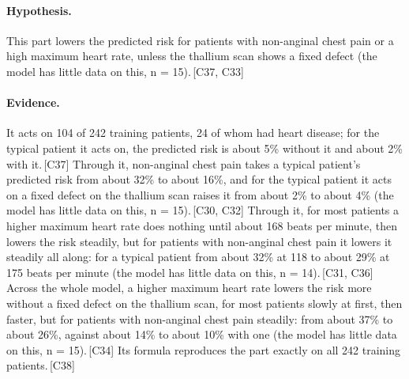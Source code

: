 \documentclass[a4paper,10pt]{article}
\newif\ifreviewmarks
\newcommand{\reviewrule}{\noindent{\color{BrickRed}\rule{\linewidth}{0.8pt}}}
\newenvironment{drafted}[1][]{%
  \ifreviewmarks\par\addvspace{\medskipamount}\reviewrule\par\nopagebreak
  \noindent{\color{BrickRed}\sffamily\footnotesize\textbf{Thesis Draft}\quad #1\hfill review}\par\nopagebreak\smallskip\fi}{%
  \ifreviewmarks\par\smallskip\noindent{\color{BrickRed}\sffamily\footnotesize end of thesis draft}\par\nopagebreak\reviewrule\par\medskip\fi}
\begin{document}
\begin{drafted}[plain-language layer: heart-s2-c2]
\paragraph{Hypothesis.} This part lowers the predicted risk for patients with non-anginal chest pain or a high maximum heart rate, unless the thallium scan shows a fixed defect (the model has little data on this, n = 15).\,{\scriptsize\textcolor{NavyBlue}{[C37, C33]}}
\paragraph{Evidence.} It acts on 104 of 242 training patients, 24 of whom had heart disease; for the typical patient it acts on, the predicted risk is about 5\% without it and about 2\% with it.\,{\scriptsize\textcolor{NavyBlue}{[C37]}} Through it, non-anginal chest pain takes a typical patient's predicted risk from about 32\% to about 16\%, and for the typical patient it acts on a fixed defect on the thallium scan raises it from about 2\% to about 4\% (the model has little data on this, n = 15).\,{\scriptsize\textcolor{NavyBlue}{[C30, C32]}} Through it, for most patients a higher maximum heart rate does nothing until about 168 beats per minute, then lowers the risk steadily, but for patients with non-anginal chest pain it lowers it steadily all along: for a typical patient from about 32\% at 118 to about 29\% at 175 beats per minute (the model has little data on this, n = 14).\,{\scriptsize\textcolor{NavyBlue}{[C31, C36]}} Across the whole model, a higher maximum heart rate lowers the risk more without a fixed defect on the thallium scan, for most patients slowly at first, then faster, but for patients with non-anginal chest pain steadily: from about 37\% to about 26\%, against about 14\% to about 10\% with one (the model has little data on this, n = 15).\,{\scriptsize\textcolor{NavyBlue}{[C34]}} Its formula reproduces the part exactly on all 242 training patients.\,{\scriptsize\textcolor{NavyBlue}{[C38]}}
\par{}
\par{}

\end{drafted}
\end{document}
